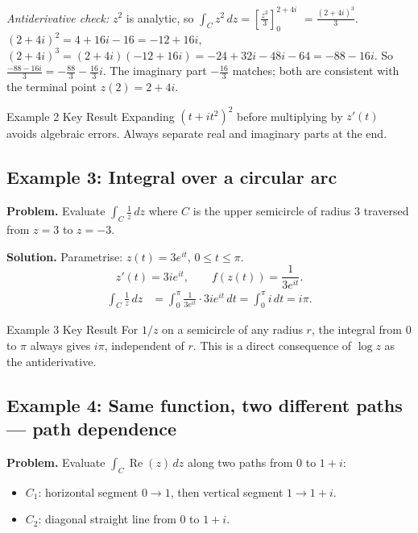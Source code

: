 \documentclass[12pt,a4paper]{article}
\begin{document}
\textit{Antiderivative check:} $z^2$ is analytic, so
$\int_C z^2\,dz = \left[\frac{z^3}{3}\right]_0^{2+4i}$
$= \frac{(2+4i)^3}{3}$.
$(2+4i)^2 = 4+16i-16 = -12+16i$,
$(2+4i)^3 = (2+4i)(-12+16i) = -24+32i-48i-64 = -88-16i$.
So $\frac{-88-16i}{3} = -\frac{88}{3} - \frac{16}{3}i$.
The imaginary part $-\frac{16}{3}$ matches; both are consistent with the
terminal point $z(2) = 2+4i$. \checkmark

\begin{learnbox}{Example 2 Key Result}
Expanding $(t + it^2)^2$ before multiplying by $z'(t)$ avoids algebraic
errors. Always separate real and imaginary parts at the end.
\end{learnbox}

\subsection*{Example 3: Integral over a circular arc}

\textbf{Problem.} Evaluate $\displaystyle\int_C \frac{1}{z}\,dz$ where $C$
is the upper semicircle of radius $3$ traversed from $z = 3$ to $z = -3$.

\textbf{Solution.}
Parametrise: $z(t) = 3e^{it}$, $0 \le t \le \pi$.
\[
  z'(t) = 3ie^{it}, \qquad f(z(t)) = \frac{1}{3e^{it}}.
\]
\begin{align*}
  \int_C \frac{1}{z}\,dz
  &= \int_0^\pi \frac{1}{3e^{it}} \cdot 3ie^{it}\,dt
   = \int_0^\pi i\,dt
   = i\pi.
\end{align*}

\begin{learnbox}{Example 3 Key Result}
For $1/z$ on a semicircle of any radius $r$, the integral from $0$ to $\pi$
always gives $i\pi$, independent of $r$. This is a direct consequence of
$\log z$ as the antiderivative.
\end{learnbox}

\subsection*{Example 4: Same function, two different paths --- path dependence}

\textbf{Problem.} Evaluate $\displaystyle\int_C \operatorname{Re}(z)\,dz$
along two paths from $0$ to $1+i$:
\begin{itemize}[nosep]
  \item $C_1$: horizontal segment $0 \to 1$, then vertical segment $1 \to 1+i$.
  \item $C_2$: diagonal straight line from $0$ to $1+i$.
\end{itemize}
\end{document}
